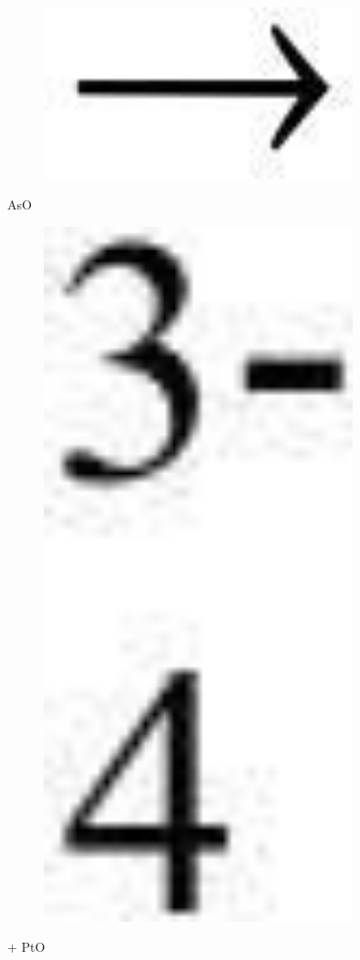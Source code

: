 \begin{figure}[H]
	\centering
	\includegraphics[width=0.8\textwidth]{assets/334}
	\caption*{}
\end{figure}
AsO\begin{figure}[H]
	\centering
	\includegraphics[width=0.8\textwidth]{assets/335}
	\caption*{}
\end{figure} + PtO

